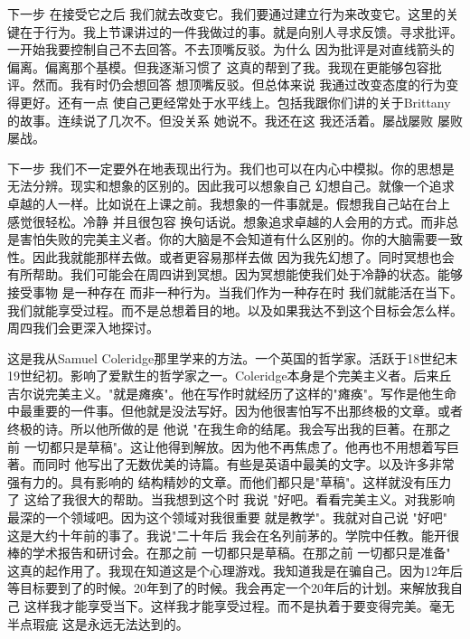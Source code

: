 下一步 在接受它之后 我们就去改变它。我们要通过建立行为来改变它。这里的关键在于行为。我上节课讲过的一件我做过的事。就是向别人寻求反馈。寻求批评。一开始我要控制自己不去回答。不去顶嘴反驳。为什么 因为批评是对直线箭头的偏离。偏离那个基模。但我逐渐习惯了 这真的帮到了我。我现在更能够包容批评。然而。我有时仍会想回答 想顶嘴反驳。但总体来说 我通过改变态度的行为变得更好。还有一点 使自己更经常处于水平线上。包括我跟你们讲的关于Brittany的故事。连续说了几次不。但没关系 她说不。我还在这 我还活着。屡战屡败 屡败屡战。 

下一步 我们不一定要外在地表现出行为。我们也可以在内心中模拟。你的思想是无法分辨。现实和想象的区别的。因此我可以想象自己 幻想自己。就像一个追求卓越的人一样。比如说在上课之前。我想象的一件事就是。假想我自己站在台上 感觉很轻松。冷静 并且很包容 换句话说。想象追求卓越的人会用的方式。而非总是害怕失败的完美主义者。你的大脑是不会知道有什么区别的。你的大脑需要一致性。因此我就能那样去做。或者更容易那样去做 因为我先幻想了。同时冥想也会有所帮助。我们可能会在周四讲到冥想。因为冥想能使我们处于冷静的状态。能够接受事物 是一种存在 而非一种行为。当我们作为一种存在时 我们就能活在当下。我们就能享受过程。而不是总想着目的地。以及如果我达不到这个目标会怎么样。周四我们会更深入地探讨。 

这是我从Samuel Coleridge那里学来的方法。一个英国的哲学家。活跃于18世纪末 19世纪初。影响了爱默生的哲学家之一。Coleridge本身是个完美主义者。后来丘吉尔说完美主义。"就是瘫痪"。他在写作时就经历了这样的"瘫痪"。写作是他生命中最重要的一件事。但他就是没法写好。因为他很害怕写不出那终极的文章。或者终极的诗。所以他所做的是 他说 "在我生命的结尾。我会写出我的巨著。在那之前 一切都只是草稿"。这让他得到解放。因为他不再焦虑了。他再也不用想着写巨著。而同时 他写出了无数优美的诗篇。有些是英语中最美的文字。以及许多非常强有力的。具有影响的 结构精妙的文章。而他们都只是"草稿"。这样就没有压力了 这给了我很大的帮助。当我想到这个时 我说 "好吧。看看完美主义。对我影响最深的一个领域吧。因为这个领域对我很重要 就是教学"。我就对自己说 "好吧" 这是大约十年前的事了。我说"二十年后 我会在名列前茅的。学院中任教。能开很棒的学术报告和研讨会。在那之前 一切都只是草稿。在那之前 一切都只是准备" 这真的起作用了。我现在知道这是个心理游戏。我知道我是在骗自己。因为12年后 等目标要到了的时候。20年到了的时候。我会再定一个20年后的计划。来解放我自己 这样我才能享受当下。这样我才能享受过程。而不是执着于要变得完美。毫无半点瑕疵 这是永远无法达到的。 

